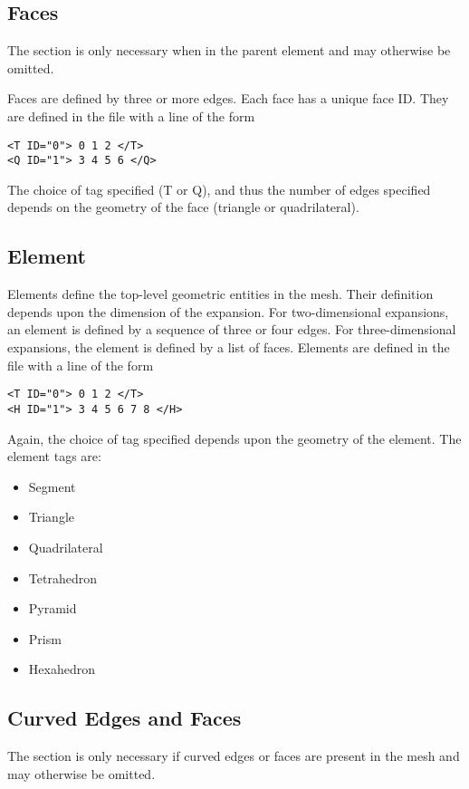 \subsection{Faces}
\begin{tipbox}
    The  section is only necessary when  in the
    parent  element and may otherwise be omitted.
\end{tipbox}

Faces are defined by three or more edges. Each face has a unique face ID. They
are defined in the file with a line of the form
\begin{lstlisting}[style=XMLStyle]
<T ID="0"> 0 1 2 </T>
<Q ID="1"> 3 4 5 6 </Q>
\end{lstlisting}
The choice of tag specified (T or Q), and thus the number of edges specified depends on the geometry of the face (triangle or quadrilateral).


\subsection{Element}
Elements define the top-level geometric entities in the mesh. Their definition depends upon the dimension of the expansion. For two-dimensional expansions, an element is defined by a sequence of three or four edges. For three-dimensional expansions, the element is defined by a list of faces. Elements are defined in the file with a line of the form
\begin{lstlisting}[style=XMLStyle]
<T ID="0"> 0 1 2 </T>
<H ID="1"> 3 4 5 6 7 8 </H>
\end{lstlisting}
Again, the choice of tag specified depends upon the geometry of the element. The element tags are:

\begin{itemize}
    \item {} Segment
    \item {} Triangle
    \item {} Quadrilateral
    \item {} Tetrahedron
    \item {} Pyramid
    \item {} Prism
    \item {} Hexahedron
\end{itemize}


\subsection{Curved Edges and Faces}
\begin{tipbox}
    The  section is only necessary if curved edges or faces are
    present in the mesh and may otherwise be omitted.
\end{tipbox}

